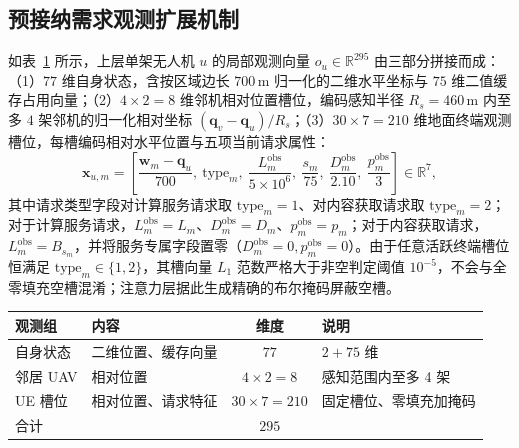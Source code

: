 \subsection{预接纳需求观测扩展机制}
\label{sec:obs-action}
\label{sec:coverage-observation}
\label{sec:obs-motivation}
\label{sec:slot-filling}

如表~\ref{tab:ch3-observation} 所示，上层单架无人机 $u$ 的局部观测向量 $o_u\in\mathbb{R}^{295}$ 由三部分拼接而成：（1）$77$ 维自身状态，含按区域边长 $700\,\mathrm{m}$ 归一化的二维水平坐标与 $75$ 维二值缓存占用向量；（2）$4\times 2=8$ 维邻机相对位置槽位，编码感知半径 $R_s=460\,\mathrm{m}$ 内至多 $4$ 架邻机的归一化相对坐标 $(\mathbf{q}_v-\mathbf{q}_u)/R_s$；（3）$30\times 7=210$ 维地面终端观测槽位，每槽编码相对水平位置与五项当前请求属性：
\begin{equation}
 \mathbf x_{u,m}=\left[
 \frac{\mathbf w_m-\mathbf q_u}{700},\
 \mathrm{type}_m,\
 \frac{L_m^{\mathrm{obs}}}{5\times10^6},\
 \frac{s_m}{75},\
 \frac{D_m^{\mathrm{obs}}}{2.10},\
 \frac{p_m^{\mathrm{obs}}}{3}\right]\in\mathbb{R}^7,
 \label{eq:ch3-ue-slot}
\end{equation}
其中请求类型字段对计算服务请求取 $\mathrm{type}_m=1$、对内容获取请求取 $\mathrm{type}_m=2$；对于计算服务请求，$L_m^{\mathrm{obs}}=L_m$、$D_m^{\mathrm{obs}}=D_m$、$p_m^{\mathrm{obs}}=p_m$；对于内容获取请求，$L_m^{\mathrm{obs}}=B_{s_m}$，并将服务专属字段置零（$D_m^{\mathrm{obs}}=0,p_m^{\mathrm{obs}}=0$）。由于任意活跃终端槽位恒满足 $\mathrm{type}_m\in\{1,2\}$，其槽向量 $L_1$ 范数严格大于非空判定阈值 $10^{-5}$，不会与全零填充空槽混淆；注意力层据此生成精确的布尔掩码屏蔽空槽。

\begin{table}[!htbp]
    \centering
    \label{tab:ch3-observation}
    \begin{tabular}{llcl}
        \toprule
        观测组 & 内容 & 维度 & 说明 \\
        \midrule
        自身状态 & 二维位置、缓存向量 & $77$ & $2+75$ 维 \\
        邻居 UAV & 相对位置 & $4\times2=8$ & 感知范围内至多 4 架 \\
        UE 槽位 & 相对位置、请求特征 & $30\times7=210$ & 固定槽位、零填充加掩码 \\
        \midrule
        合计 &  & $295$ &  \\
        \bottomrule
    \end{tabular}
\end{table}

